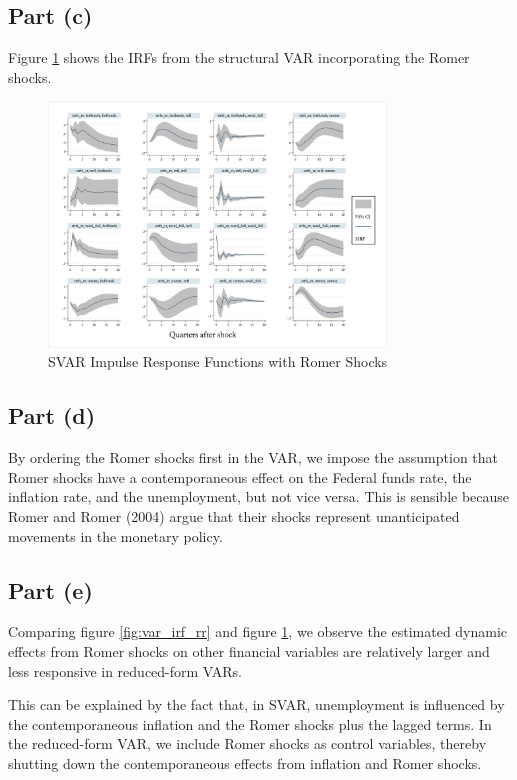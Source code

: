 \documentclass[12pt]{article}
\begin{document}
\subsection*{Part (c)} 

Figure \ref{fig:svar_irf_rr} shows the IRFs from the structural VAR incorporating the Romer shocks.

\begin{figure}[ht]
    \centering
    \includegraphics[width=0.8\textwidth]{figs/svar_irf_rr.png}
    \caption{SVAR Impulse Response Functions with Romer Shocks}
    \label{fig:svar_irf_rr}
\end{figure}

\subsection*{Part (d)} 

By ordering the Romer shocks first in the VAR, 
we impose the assumption that Romer shocks have a contemporaneous effect on the Federal funds rate, the inflation rate, and the unemployment, but not vice versa. 
This is sensible because Romer and Romer (2004) argue that their shocks represent unanticipated movements in the monetary policy. 

\subsection*{Part (e)} 

Comparing figure \ref{fig:var_irf_rr} and figure \ref{fig:svar_irf_rr}, 
we observe the estimated dynamic effects from Romer shocks on other financial variables are relatively larger and less responsive in reduced-form VARs. 

This can be explained by the fact that, in SVAR, 
unemployment is influenced by the contemporaneous inflation and the Romer shocks plus the lagged terms. 
In the reduced-form VAR, we include Romer shocks as control variables,
thereby shutting down the contemporaneous effects from inflation and Romer shocks. 
\end{document}
